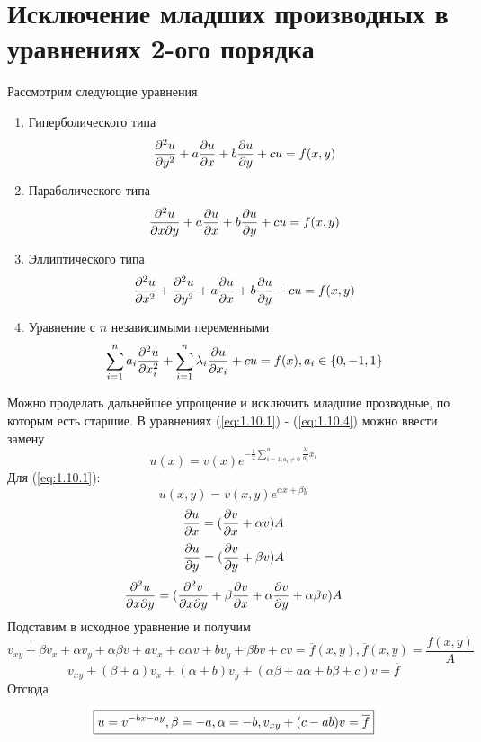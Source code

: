 \documentclass[../main.tex]{subfiles}
\begin{document}
\section{Исключение младших производных в уравнениях 2-ого порядка}
Рассмотрим следующие уравнения
{\bf
\begin{enumerate}
    \item Гиперболического типа
    \begin{equation} \label{eq:1.10.1}
        \frac{\partial ^2 u}{\partial y^2} + a \frac{\partial u}{\partial x} + b \frac{\partial u}{\partial y} + cu = f(x, y)
    \end{equation}
    \item Параболического типа
    \begin{equation} \label{eq:1.10.2}
        \frac{\partial ^2 u}{\partial x \partial y} + a \frac{\partial u}{\partial x} + b \frac{\partial u}{\partial y} + cu = f(x, y)
    \end{equation}
    \item Эллиптического типа
    \begin{equation} \label{eq:1.10.3}
        \frac{\partial ^2 u}{\partial x^2} + \frac{\partial^2 u}{\partial y^2} + a \frac{\partial u}{\partial x} + b \frac{\partial u}{\partial y} + cu = f(x, y)
    \end{equation}
    \item Уравнение с $n$ независимыми переменными
    \begin{equation} \label{eq:1.10.4}
        \sum_{i=1}^n a_i \frac{\partial^2 u }{\partial x_i^2} + \sum_{i=1}^n \lambda_i \frac{\partial u}{\partial x_i} + cu = f(x), a_i \in \{0, -1, 1\}
    \end{equation}
\end{enumerate}}
Можно проделать дальнейшее упрощение и исключить младшие прозводные, по которым есть старшие.
В уравнениях (\ref{eq:1.10.1}) - (\ref{eq:1.10.4}) можно ввести замену
$$u(x) = v(x)e^{-\frac{1}{2} \sum \limits_{i=1, a_i \neq 0}^n \frac{\lambda_i}{a_i} x_i}$$
Для (\ref{eq:1.10.1}):
$$u(x,y) = v(x,y) e ^ {\alpha x + \beta y}$$
$$\frac{\partial u}{\partial x} = (\frac{\partial v}{\partial x}+\alpha v)A$$
$$\frac{\partial u}{\partial y} = (\frac{\partial v}{\partial y}+\beta v)A$$
$$\frac{\partial^2 u}{\partial x \partial y} = (\frac{\partial^2 v}{\partial x \partial y} + \beta \frac{\partial v}{\partial x} + \alpha \frac{\partial v}{\partial y} + \alpha \beta v)A$$
Подставим в исходное уравнение и получим
$$v_{xy} + \beta v_x + \alpha v_y + \alpha \beta v + a v_x + a \alpha v + b v_y + \beta b v + cv = \overline{f}(x,y), \overline{f}(x,y) = \frac{f(x,y)}{A}$$
$$v_{xy} + (\beta + a)v_x + (\alpha + b)v_y + (\alpha \beta + a \alpha + b \beta + c)v = \overline{f}$$
Отсюда

\begin{equation*}
    \boxed{
        u = v^{-bx - ay}, \\
        \beta = -a, \alpha = -b,\\
        v_{xy} + (c-ab)v = \overline{f} 
    }
\end{equation*}
\end{document}
